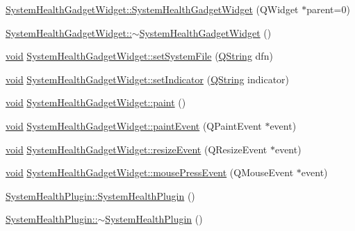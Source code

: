 \begin{DoxyCompactItemize}
\item 
\hyperlink{group___system_health_plugin_ga8c9b20860af6995ec8b6970079e00477}{System\-Health\-Gadget\-Widget\-::\-System\-Health\-Gadget\-Widget} (Q\-Widget $\ast$parent=0)
\item 
\hyperlink{group___system_health_plugin_gaafd1c69ed4569708eef2b628c1125ea8}{System\-Health\-Gadget\-Widget\-::$\sim$\-System\-Health\-Gadget\-Widget} ()
\item 
\hyperlink{group___u_a_v_objects_plugin_ga444cf2ff3f0ecbe028adce838d373f5c}{void} \hyperlink{group___system_health_plugin_ga1caae283affc79dc1e9e0303d39d4158}{System\-Health\-Gadget\-Widget\-::set\-System\-File} (\hyperlink{group___u_a_v_objects_plugin_gab9d252f49c333c94a72f97ce3105a32d}{Q\-String} dfn)
\item 
\hyperlink{group___u_a_v_objects_plugin_ga444cf2ff3f0ecbe028adce838d373f5c}{void} \hyperlink{group___system_health_plugin_gaf6ee345730445a2552355fcd54cb33cf}{System\-Health\-Gadget\-Widget\-::set\-Indicator} (\hyperlink{group___u_a_v_objects_plugin_gab9d252f49c333c94a72f97ce3105a32d}{Q\-String} indicator)
\item 
\hyperlink{group___u_a_v_objects_plugin_ga444cf2ff3f0ecbe028adce838d373f5c}{void} \hyperlink{group___system_health_plugin_ga58a24548867f2bb40b36dfc3e0fc4b9e}{System\-Health\-Gadget\-Widget\-::paint} ()
\item 
\hyperlink{group___u_a_v_objects_plugin_ga444cf2ff3f0ecbe028adce838d373f5c}{void} \hyperlink{group___system_health_plugin_gaefb5569e2941f96ea452bb2e43575aed}{System\-Health\-Gadget\-Widget\-::paint\-Event} (Q\-Paint\-Event $\ast$event)
\item 
\hyperlink{group___u_a_v_objects_plugin_ga444cf2ff3f0ecbe028adce838d373f5c}{void} \hyperlink{group___system_health_plugin_gacfa993929fde9cc3153dafa5a6509d65}{System\-Health\-Gadget\-Widget\-::resize\-Event} (Q\-Resize\-Event $\ast$event)
\item 
\hyperlink{group___u_a_v_objects_plugin_ga444cf2ff3f0ecbe028adce838d373f5c}{void} \hyperlink{group___system_health_plugin_ga2558a85d789a3f51c15c92ac329b26d7}{System\-Health\-Gadget\-Widget\-::mouse\-Press\-Event} (Q\-Mouse\-Event $\ast$event)
\item 
\hyperlink{group___system_health_plugin_gaccd196e55a7a3a7b48fcc59ee62a5a8b}{System\-Health\-Plugin\-::\-System\-Health\-Plugin} ()
\item 
\hyperlink{group___system_health_plugin_ga8c480b9596c0968c7bece8bb13874fd5}{System\-Health\-Plugin\-::$\sim$\-System\-Health\-Plugin} ()
\item 

\end{DoxyCompactItemize}
